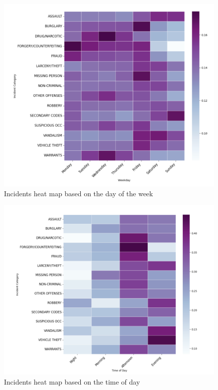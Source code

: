 \documentclass[10 pt,conference,final,]{IEEEtran}
\begin{document}
\begin{figure}

{\centering \includegraphics[width=0.9\linewidth]{img/fig5} 

}

\caption{Incidents heat map based on the day of the week}\label{fig:unnamed-chunk-5}
\end{figure}

\begin{figure}

{\centering \includegraphics[width=0.9\linewidth]{img/fig6} 

}

\caption{Incidents heat map based on the time of day}\label{fig:unnamed-chunk-6}
\end{figure}
\end{document}

